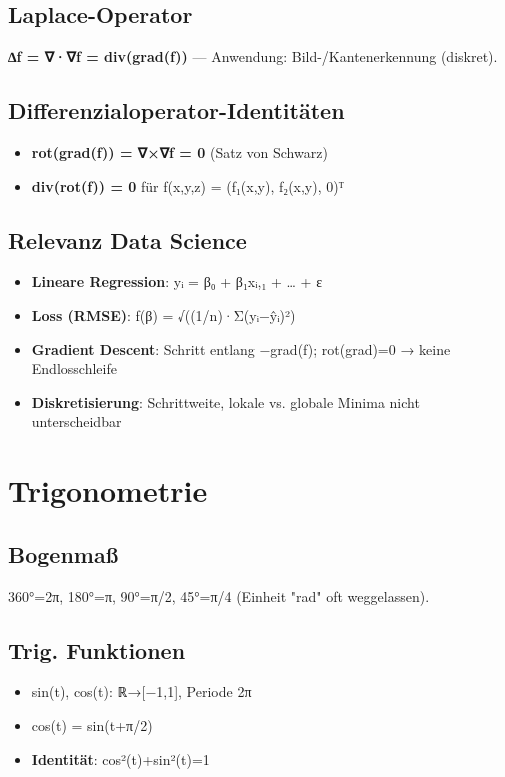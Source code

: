 \documentclass[11pt, a4paper]{article}
\begin{document}
\subsection{Laplace-Operator}
\textbf{∆f = ∇·∇f = div(grad(f))} — Anwendung: Bild-/Kantenerkennung (diskret).



\subsection{Differenzialoperator-Identitäten}
\begin{itemize}
  \item \textbf{rot(grad(f)) = ∇×∇f = 0} (Satz von Schwarz)
  \item \textbf{div(rot(f)) = 0} für f(x,y,z) = (f₁(x,y), f₂(x,y), 0)ᵀ
\end{itemize}


\subsection{Relevanz Data Science}
\begin{itemize}
  \item \textbf{Lineare Regression}: yᵢ = β₀ + β₁xᵢ,₁ + … + ε
  \item \textbf{Loss (RMSE)}: f(β) = √((1/n)·Σ(yᵢ−ŷᵢ)²)
  \item \textbf{Gradient Descent}: Schritt entlang −grad(f); rot(grad)=0 → keine Endlosschleife
  \item \textbf{Diskretisierung}: Schrittweite, lokale vs. globale Minima nicht unterscheidbar
\end{itemize}


\section{Trigonometrie}


\subsection{Bogenmaß}
360°=2π, 180°=π, 90°=π/2, 45°=π/4 (Einheit "rad" oft weggelassen).



\subsection{Trig. Funktionen}
\begin{itemize}
  \item sin(t), cos(t): ℝ→[−1,1], Periode 2π
  \item cos(t) = sin(t+π/2)
  \item \textbf{Identität}: cos²(t)+sin²(t)=1
\end{itemize}
\end{document}
